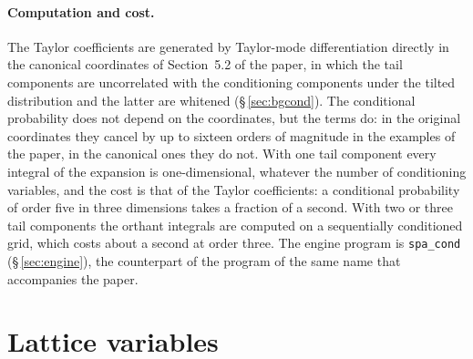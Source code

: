 \documentclass[11pt]{article}
\newcommand{\prog}[1]{\texttt{#1}}
\begin{document}
\paragraph{Computation and cost.} The Taylor coefficients are generated by Taylor-mode
differentiation directly in the canonical coordinates of Section~5.2 of the paper, in which the tail
components are uncorrelated with the conditioning components under the tilted distribution and the
latter are whitened (\S\,\ref{sec:bgcond}). The conditional probability does not depend on the
coordinates, but the terms do: in the original coordinates they cancel by up to sixteen orders of
magnitude in the examples of the paper, in the canonical ones they do not. With one tail component
every integral of the expansion is one-dimensional, whatever the number of conditioning variables,
and the cost is that of the Taylor coefficients: a conditional probability of order five in three
dimensions takes a fraction of a second. With two or three tail components the orthant integrals are
computed on a sequentially conditioned grid, which costs about a second at order three. The engine
program is \prog{spa\_cond} (\S\,\ref{sec:engine}), the counterpart of the program of the same name
that accompanies the paper.

\section{Lattice variables}\label{sec:lattice}
\end{document}
